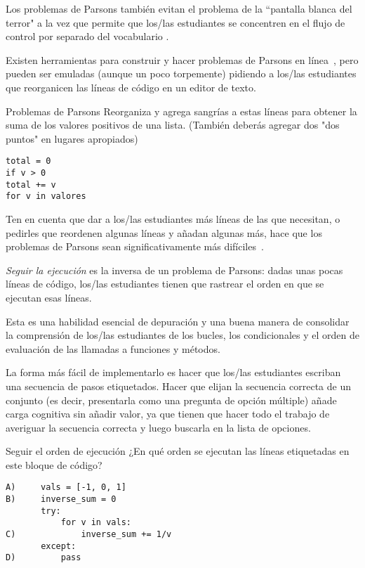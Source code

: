 Los problemas de Parsons  también evitan el problema de la ``pantalla blanca del terror" a la vez que permite que los/las estudiantes se concentren en el flujo de control por separado del vocabulario \cite{Pars2006,Eric2015,Morr2016,Eric2017}.

Existen herramientas para construir y hacer problemas de Parsons en línea~\cite{Ihan2011},
pero pueden ser emuladas (aunque un poco torpemente) 
pidiendo a los/las estudiantes que reorganicen las líneas de código en un editor de texto.

\begin{aside}{Problemas de Parsons}
  Reorganiza y agrega sangrías a estas líneas para obtener la suma de los valores positivos de una lista.
  (También deberás agregar dos "dos puntos" en lugares apropiados)

\begin{verbatim}
total = 0
if v > 0
total += v
for v in valores
\end{verbatim}
\end{aside}

Ten en cuenta que dar a los/las estudiantes más líneas de las que necesitan, o pedirles que reordenen algunas líneas y añadan algunas más, hace que los problemas de Parsons sean significativamente más difíciles~\cite{Harm2016}.


\emph{Seguir la ejecución} es la inversa de un problema de Parsons: 
dadas unas pocas líneas de código, 
los/las estudiantes tienen que rastrear el orden en que se ejecutan esas líneas.

Esta es una habilidad esencial de depuración 
 y una buena manera de consolidar la comprensión de los/las estudiantes de los bucles, los condicionales y el orden de evaluación de las llamadas a funciones y  métodos.

La forma más fácil de implementarlo es hacer que los/las estudiantes escriban una secuencia de pasos etiquetados.
Hacer que elijan la secuencia correcta de un conjunto 
(es decir, presentarla como una pregunta de opción múltiple) 
añade carga cognitiva sin añadir valor, 
ya que tienen que hacer todo el trabajo de averiguar la secuencia correcta y luego buscarla en la lista de opciones.

\begin{aside}{Seguir el orden de ejecución}
  ¿En qué orden se ejecutan las líneas etiquetadas en este bloque de código?

\begin{verbatim}
A)     vals = [-1, 0, 1]
B)     inverse_sum = 0
       try:
           for v in vals:
C)             inverse_sum += 1/v
       except:
D)         pass
\end{verbatim}
\end{aside}

